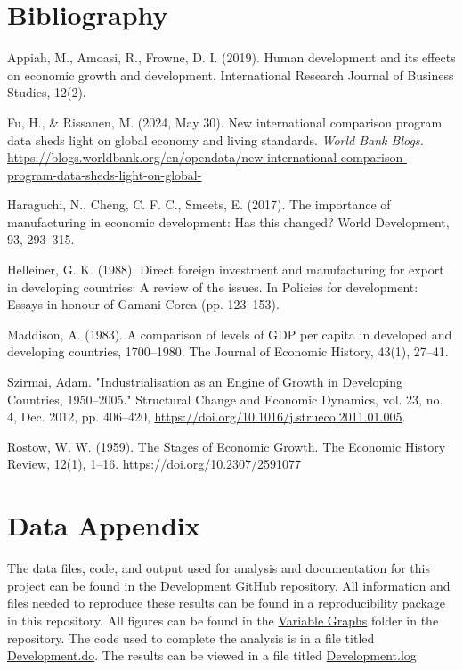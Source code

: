 \documentclass[12pt]{article}
\begin{document}
\newpage
\section*{Bibliography}
\singlespacing
\setlength\bibsep{0pt}

Appiah, M., Amoasi, R., Frowne, D. I. (2019). Human development and its effects on economic growth and development. International Research Journal of Business Studies, 12(2).

Fu, H., \& Rissanen, M. (2024, May 30). New international comparison program data sheds light on global economy and living standards. \textit{World Bank Blogs.} \href{https://blogs.worldbank.org/en/opendata/new-international-comparison-program-data-sheds-light-on-global-}{https://blogs.worldbank.org/en/opendata/new-international-comparison-program-data-sheds-light-on-global-}

Haraguchi, N., Cheng, C. F. C., Smeets, E. (2017). The importance of manufacturing in economic development: Has this changed? World Development, 93, 293–315.

Helleiner, G. K. (1988). Direct foreign investment and manufacturing for export in developing countries: A review of the issues. In Policies for development: Essays in honour of Gamani Corea (pp. 123–153).

Maddison, A. (1983). A comparison of levels of GDP per capita in developed and developing countries, 1700–1980. The Journal of Economic History, 43(1), 27–41.

Szirmai, Adam. "Industrialisation as an Engine of Growth in Developing Countries, 1950–2005." Structural Change and Economic Dynamics, vol. 23, no. 4, Dec. 2012, pp. 406–420, \href{https://doi.org/10.1016/j.strueco.2011.01.005}{https://doi.org/10.1016/j.strueco.2011.01.005}.

Rostow, W. W. (1959). The Stages of Economic Growth. The Economic History Review, 12(1), 1–16. https://doi.org/10.2307/2591077


\newpage
\section*{Data Appendix} \label{sec:appendixa}

The data files, code, and output used for analysis and documentation for this project can be found in the Development \href{https://github.com/ecn310/course-project-developmentv}{GitHub repository}. All information and files needed to reproduce these results can be found in a \href{https://github.com/ecn310/course-project-development/tree/main/Reproducibility%20Package}{reproducibility package} in this repository. All figures can be found in the \href{https://github.com/ecn310/course-project-development/tree/main/Variable%20Graphs}{Variable Graphs} folder in the repository. The code used to complete the analysis is in a file titled \href{https://github.com/ecn310/course-project-development/tree/main/Reproducibility%20Package}{Development.do}. 
The results can be viewed in a file titled \href{https://github.com/ecn310/course-project-development/blob/main/Merge_GDP_Mftc.log}{Development.log} 
 
\end{document}
